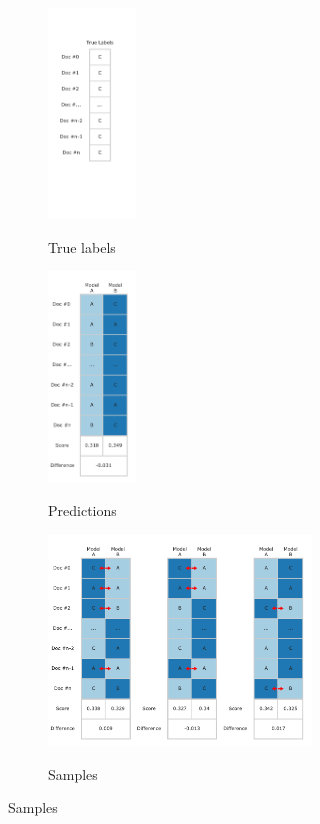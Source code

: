 \begin{figure}[ht]
  \begin{subfigure}[t]{0.29\linewidth}
  \centering
  {\includegraphics[height=2.2in]{assets/figures/permutation_test/true_labels.pdf}\label{fig:permutation_test_true}}
  \caption{True labels}
  \end{subfigure}
  \hfill
  \begin{subfigure}[t]{.29\linewidth}
  \centering
  {\includegraphics[height=2.2in]{assets/figures/permutation_test/initial_predictions.pdf}\label{fig:permutation_test_model_predictions}}
  \caption{Predictions}
  \end{subfigure}
  \hfill
  \begin{subfigure}[t]{0.40\linewidth}
  \centering
  {\includegraphics[height=2.2in]{assets/figures/permutation_test/samples.pdf}\label{fig:permutation_test_samples}}
  \caption{Samples}
  \end{subfigure}

\end{figure}
